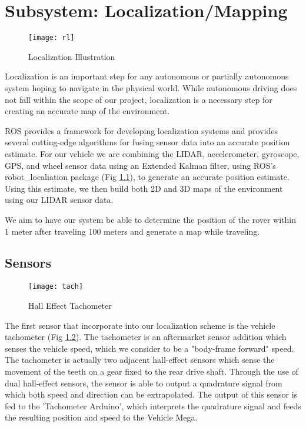 \chapter{Subsystem: Localization/Mapping} \label{chap:Localization}


\begin{figure}[H]
	\centerline{\texttt{[image: rl]}}
	\caption[]{Localization Illustration \cite{clearpath}}
	\label{fig:robotlocalization}
\end{figure}

Localization is an important step for any autonomous or partially autonomous system hoping to navigate in the physical world. While autonomous driving does not fall within the scope of our project, localization is a necessary step for creating an accurate map of the environment. 

ROS provides a framework for developing localization systems and provides several cutting-edge algorithms for fusing sensor data into an accurate position estimate. For our vehicle we are combining the LIDAR, accelerometer, gyroscope, GPS, and wheel sensor data using an Extended Kalman filter, using ROS's robot\_localiation package (Fig \ref{fig:robotlocalization}), to generate an accurate position estimate. Using this estimate, we then build both 2D and 3D maps of the environment using our LIDAR sensor data. 

We aim to have our system be able to determine the position of the rover within 1 meter after traveling 100 meters and generate a map while traveling.

\section{Sensors}


\begin{figure}[H]
	\centerline{\texttt{[image: tach]}}
	\caption[]{Hall Effect Tachometer}
	\label{fig:tach}
\end{figure}

The first sensor that incorporate into our localization scheme is the vehicle tachometer (Fig \ref{fig:tach}). The tachometer is an aftermarket sensor addition which senses the vehicle speed, which we consider to be a "body-frame forward" speed. The tachometer is actually two adjacent hall-effect sensors which sense the movement of the teeth on a gear fixed to the rear drive shaft. Through the use of dual hall-effect sensors, the sensor is able to output a quadrature signal from which both speed and direction can be extrapolated. The output of this sensor is fed to the 'Tachometer Arduino', which interprets the quadrature signal and feeds the resulting position and speed to the Vehicle Mega.


